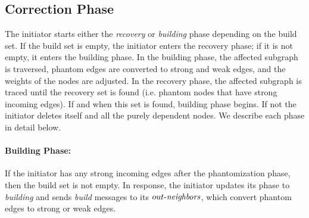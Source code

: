 \begin{comment}
\begin{lemma}[Message size Complexity]
Phantomization sends messages of O(log(n)) size, where n is the total number of nodes
in the graph.
\label{MSCP}
\end{lemma}
\begin{proofs}
The \emph{phantomize} messages have to hold a value at least as large as the count of nodes in the system
which are O(log(n)) size. Apart from the ids, the message also contains the weight of
node which is constant in size. In the return message, our algorithm only uses the id
of the sender and receiver. So all our messages in the phantomization are of
O(log(n)) size.
\end{proofs}

\end{comment}

\subsection{Correction Phase}

The initiator starts either the \emph{recovery} or \emph{building} phase depending on the build set. 
If the build set is empty, the initiator enters the recovery phase; if it is
not empty, it enters the building phase.
In the building phase, the affected subgraph is traversed, phantom edges are
converted to strong and weak edges, and the weights of the nodes are adjusted.
In the recovery phase, the affected subgraph is traced until the recovery set is found (i.e. phantom nodes
that have strong incoming edges). If and when this set is found, building phase begins. If not
the initiator deletes itself and all the purely
dependent nodes. We describe each phase in detail below.  

\paragraph{Building Phase:}
If the initiator has any strong incoming edges after the phantomization phase, then
the build set is not empty. In response, the initiator updates its phase to \emph{building}
and sends \emph{build} messages to
its $\mathop{\mbox{$out$-$\mathit{neighbors}$}}$, which convert phantom edges to strong or weak edges.


